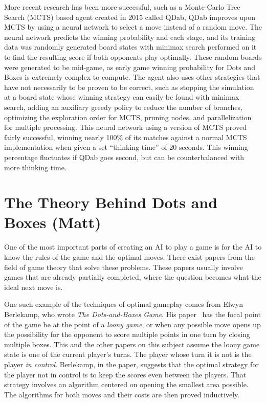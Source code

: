 \documentclass[12pt]{article}
\begin{document}
    More recent research has been more successful, such as a Monte-Carlo Tree Search (MCTS) based agent created in 2015 called QDab, QDab improves upon MCTS by using a neural network to select a move instead of a random move. The neural network predicts the winning probability and each stage, and its training data was randomly generated board states with minimax search performed on it to find the resulting score if both opponents play optimally. These random boards were generated to be mid-game, as early game winning probability for Dots and Boxes is extremely complex to compute. The agent also uses other strategies that have not necessarily to be proven to be correct, such as stopping the simulation at a board state whose winning strategy can easily be found with minimax search, adding an auxiliary greedy policy to reduce the number of branches, optimizing the exploration order for MCTS, pruning nodes, and parallelization for multiple processing. This neural network using a version of MCTS proved fairly successful, winning nearly 100\% of its matches against a normal MCTS implementation when given a set ``thinking time'' of 20 seconds. This winning percentage fluctuates if QDab goes second, but can be counterbalanced with more thinking time. 
    
    \section*{The Theory Behind Dots and Boxes (Matt)}

    One of the most important parts of creating an AI to play a game is for the AI to know the rules of the game and the optimal moves. There exist papers from the field of game theory that solve these problems. These papers usually involve games that are already partially completed, where the question becomes what the ideal next move is.

    One such example of the techniques of optimal gameplay comes from Elwyn Berlekamp, who wrote \emph{The Dots-and-Boxes Game}. His paper~\cite{berlekamp2000} has the focal point of the game be at the point of a \emph{loony game}, or when any possible move opens up the possibility for the opponent to score multiple points in one turn by closing multiple boxes. This and the other papers on this subject assume the loony game state is one of the current player's turns. The player whose turn it is not is the player \emph{in control}. Berlekamp, in the paper, suggests that the optimal strategy for the player not in control is to keep the scores even between the players. That strategy involves an algorithm centered on opening the smallest area possible. The algorithms for both moves and their costs are then proved inductively.
\end{document}
